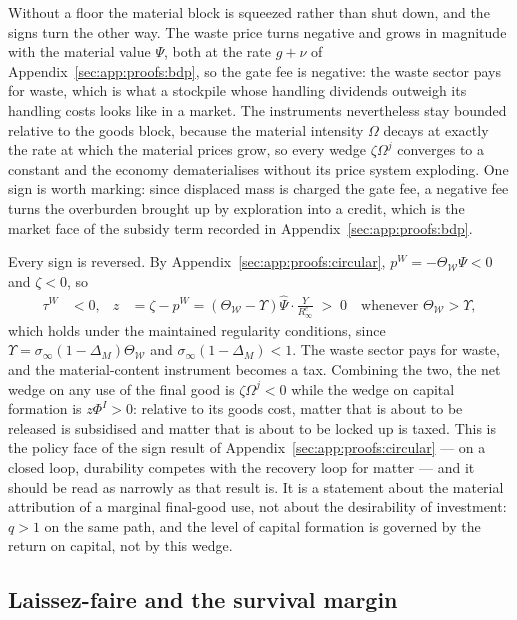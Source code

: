  Without a floor the material block is squeezed rather than shut down, and the signs turn the other way. The waste price turns negative and grows in magnitude with the material value $\Psi$, both at the rate $g+\nu$ of Appendix~\ref{sec:app:proofs:bdp}, so the gate fee is negative: the waste sector pays for waste, which is what a stockpile whose handling dividends outweigh its handling costs looks like in a market. The instruments nevertheless stay bounded relative to the goods block, because the material intensity $\Omega$ decays at exactly the rate at which the material prices grow, so every wedge $\zeta\Omega^j$ converges to a constant and the economy dematerialises without its price system exploding. One sign is worth marking: since displaced mass is charged the gate fee, a negative fee turns the overburden brought up by exploration into a credit, which is the market face of the subsidy term recorded in Appendix~\ref{sec:app:proofs:bdp}.

 Every sign is reversed. By Appendix~\ref{sec:app:proofs:circular}, $p^W=-\Theta_{\mathcal W}\Psi<0$ and $\zeta<0$, so
\begin{align}
\tau^W &<0,
&
z &= \zeta-p^W = \left(\Theta_{\mathcal W}-\Upsilon\right)\hat\Psi\cdot\frac{Y}{R^e_\infty}\;>\;0
\quad\text{whenever }\Theta_{\mathcal W}>\Upsilon,
\label{eq:mkt:cbgp-instruments}
\end{align}
which holds under the maintained regularity conditions, since $\Upsilon=\sigma_\infty\left(1-\Delta_M\right)\Theta_{\mathcal W}$ and $\sigma_\infty\left(1-\Delta_M\right)<1$. The waste sector pays for waste, and the material-content instrument becomes a tax. Combining the two, the net wedge on any use of the final good is $\zeta\Omega^j<0$ while the wedge on capital formation is $z\Phi^I>0$: relative to its goods cost, matter that is about to be released is subsidised and matter that is about to be locked up is taxed. This is the policy face of the sign result of Appendix~\ref{sec:app:proofs:circular} --- on a closed loop, durability competes with the recovery loop for matter --- and it should be read as narrowly as that result is. It is a statement about the material attribution of a marginal final-good use, not about the desirability of investment: $q>1$ on the same path, and the level of capital formation is governed by the return on capital, not by this wedge.

\subsection{Laissez-faire and the survival margin}\label{sec:mkt:impl:survival}

